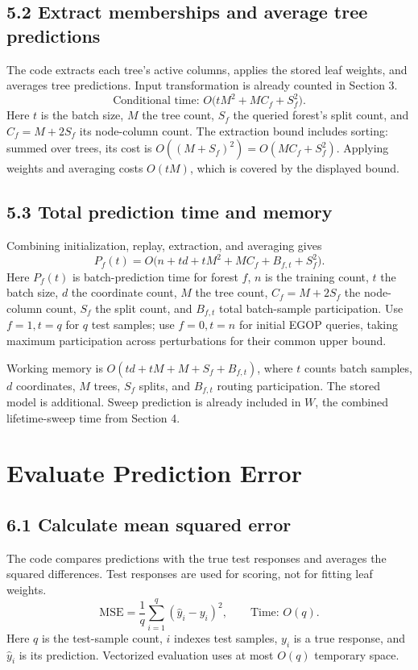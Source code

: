 \documentclass[11pt]{article}
\begin{document}
\subsection*{5.2 Extract memberships and average tree predictions}
The code extracts each tree's active columns, applies the stored leaf weights,
and averages tree predictions. Input transformation is already counted in
Section 3.
\[
\text{Conditional time: }O\bigl(tM^2+MC_f+S_f^2\bigr).
\]
Here $t$ is the batch size, $M$ the tree count, $S_f$ the queried forest's
split count, and $C_f=M+2S_f$ its node-column count.
The extraction bound includes sorting: summed over trees, its cost is
$O((M+S_f)^2)=O(MC_f+S_f^2)$. Applying weights and averaging costs $O(tM)$,
which is covered by the displayed bound.

\subsection*{5.3 Total prediction time and memory}
Combining initialization, replay, extraction, and averaging gives
\[
\boxed{P_f(t)=O\bigl(n+td+tM^2+MC_f+B_{f,t}+S_f^2\bigr).}
\]
Here $P_f(t)$ is batch-prediction time for forest $f$, $n$ is the training
count, $t$ the batch size, $d$ the coordinate count, $M$ the tree count,
$C_f=M+2S_f$ the node-column count, $S_f$ the split count, and $B_{f,t}$ total
batch-sample participation. Use $f=1,t=q$ for $q$ test samples; use $f=0,t=n$
for initial EGOP queries, taking maximum participation across perturbations
for their common upper bound.

Working memory is $O(td+tM+M+S_f+B_{f,t})$, where $t$ counts batch samples,
$d$ coordinates, $M$ trees, $S_f$ splits, and $B_{f,t}$ routing participation.
The stored model is additional. Sweep prediction is already included in $W$,
the combined lifetime-sweep time from Section 4.

\section{Evaluate Prediction Error}

\subsection*{6.1 Calculate mean squared error}
The code compares predictions with the true test responses and averages the
squared differences. Test responses are used for scoring, not for fitting
leaf weights.
\[
\mathrm{MSE}=\frac{1}{q}\sum_{i=1}^{q}(\widehat y_i-y_i)^2,
\qquad \text{Time: }O(q).
\]
Here $q$ is the test-sample count, $i$ indexes test samples, $y_i$ is a true
response, and $\widehat y_i$ is its prediction. Vectorized evaluation uses at
most $O(q)$ temporary space.
\end{document}
